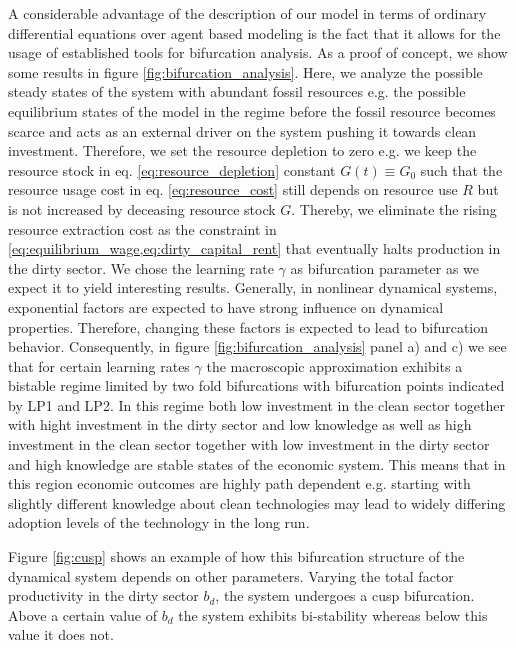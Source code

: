 A considerable advantage of the description of our model in terms of ordinary differential equations over agent based modeling is the fact that it allows for the usage of established tools for bifurcation analysis.
As a proof of concept, we show some results in figure \ref{fig:bifurcation_analysis}.
Here, we analyze the possible steady states of the system with abundant fossil resources e.g. the possible equilibrium states of the model in the regime before the fossil resource becomes scarce and acts as an external driver on the system pushing it towards clean investment.
Therefore, we set the resource depletion to zero e.g. we keep the resource stock in eq. \eqref{eq:resource_depletion} constant $G(t) \equiv G_0$ such that the resource usage cost in eq. \eqref{eq:resource_cost} still depends on resource use $R$ but is not increased by deceasing resource stock $G$. Thereby, we eliminate the rising resource extraction cost as the constraint in \cref{eq:equilibrium_wage,eq:dirty_capital_rent} that eventually halts production in the dirty sector. 
We chose the learning rate $\gamma$ as bifurcation parameter as we expect it to yield interesting results.
Generally, in nonlinear dynamical systems, exponential factors are expected to have strong influence on dynamical properties. Therefore, changing these factors is expected to lead to bifurcation behavior.
Consequently, in figure \ref{fig:bifurcation_analysis} panel a) and c) we see that for certain learning rates $\gamma$ the macroscopic approximation exhibits a bistable regime limited by two fold bifurcations with bifurcation points indicated by LP1 and LP2.
In this regime both low investment in the clean sector together with hight investment in the dirty sector and low knowledge as well as high investment in the clean sector together with low investment in the dirty sector and high knowledge are stable states of the economic system. This means that in this region economic outcomes are highly path dependent e.g. starting with slightly different knowledge about clean technologies may lead to widely differing adoption levels of the technology in the long run.

Figure \ref{fig:cusp} shows an example of how this bifurcation structure of the dynamical system depends on other parameters. Varying the total factor productivity in the dirty sector $b_d$, the system undergoes a cusp bifurcation. Above a certain value of $b_d$ the system exhibits bi-stability whereas below this value it does not.

